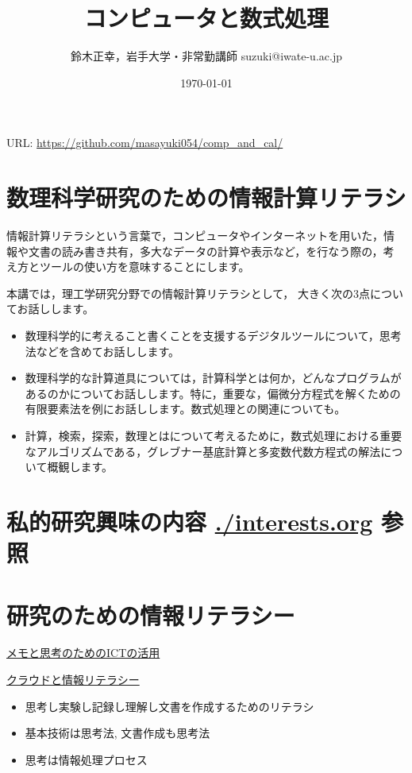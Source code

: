\documentclass[dvipdfmx,11pat]{jarticle}
\author{鈴木正幸，岩手大学・非常勤講師 suzuki@iwate-u.ac.jp}
\date{\today}
\title{コンピュータと数式処理}
\begin{document}
\maketitle
URL: \url{https://github.com/masayuki054/comp\_and\_cal/}


\section{数理科学研究のための情報計算リテラシ}
\label{sec:org7cf90d8}
情報計算リテラシという言葉で，コンピュータやインターネットを用いた，情
報や文書の読み書き共有，多大なデータの計算や表示など，を行なう際の，考
え方とツールの使い方を意味することにします。

本講では，理工学研究分野での情報計算リテラシとして，
大きく次の3点についてお話しします。

\begin{itemize}
\item 数理科学的に考えること書くことを支援するデジタルツールについて，思考
法などを含めてお話しします。

\item 数理科学的な計算道具については，計算科学とは何か，どんなプログラムが
あるのかについてお話しします。特に，重要な，偏微分方程式を解くための
有限要素法を例にお話しします。数式処理との関連についても。

\item 計算，検索，探索，数理とはについて考えるために，数式処理における重要
なアルゴリズムである，グレブナー基底計算と多変数代数方程式の解法につ
いて概観します。
\end{itemize}

\section{私的研究興味の内容 \url{./interests.org} 参照}
\label{sec:org9413581}

\section{研究のための情報リテラシー}
\label{sec:org1d1e416}

\href{https://masayuki054.github.io/ict\_literacy\_for\_thinking\_and\_memo/}{
メモと思考のためのICTの活用}

\href{https://masayuki054.github.io/cloud\_and\_information\_literacy/talk.html}{クラウドと情報リテラシー}

\begin{itemize}
\item 思考し実験し記録し理解し文書を作成するためのリテラシ
\item 基本技術は思考法, 文書作成も思考法
\item 思考は情報処理プロセス
\end{itemize}
\end{document}
